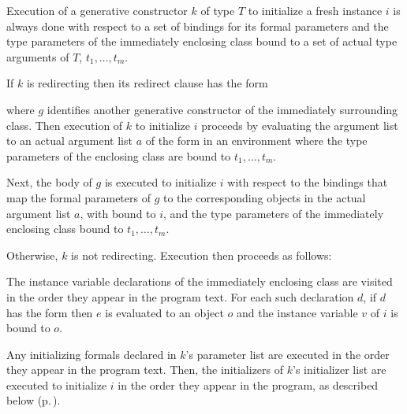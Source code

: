 \documentclass[makeidx]{article}
\begin{document}
\LMHash{}%
Execution of a generative constructor $k$ of type $T$ to initialize a fresh instance $i$
is always done with respect to a set of bindings for its formal parameters
and the type parameters of the immediately enclosing class bound to
a set of actual type arguments of $T$, $t_1, \ldots, t_m$.


\LMHash{}%
If $k$ is redirecting then its redirect clause has the form


where $g$ identifies another generative constructor of the immediately surrounding class.
Then execution of $k$ to initialize $i$ proceeds by evaluating the argument list
to an actual argument list $a$ of the form
in an environment where the type parameters of the enclosing class are bound to
$t_1, \ldots, t_m$.

\LMHash{}%
Next, the body of $g$ is executed to initialize $i$ with respect to the bindings that map
the formal parameters of $g$ to the corresponding objects in the actual argument list $a$,
with \THIS{} bound to $i$,
and the type parameters of the immediately enclosing class bound to $t_1, \ldots, t_m$.

\LMHash{}%
Otherwise, $k$ is not redirecting.
Execution then proceeds as follows:

\LMHash{}%
The instance variable declarations of the immediately enclosing class
are visited in the order they appear in the program text.
For each such declaration $d$, if $d$ has the form
then $e$ is evaluated to an object $o$
and the instance variable $v$ of $i$ is bound to $o$.

\LMHash{}%
Any initializing formals declared in $k$'s parameter list are executed in the order they appear in the program text.
Then, the initializers of $k$'s initializer list are executed to initialize $i$
in the order they appear in the program, as described below
(p.\,\pageref{executionOfInitializerLists}).
\end{document}
